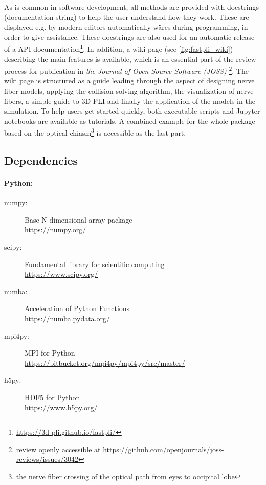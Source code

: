 % 
As is common in software development, all methods are provided with docstrings (documentation string) to help the user understand how they work.
These are displayed e.g. by modern editors automatically wäres during programming, in order to give assistance.
These docstrings are also used for an automatic release of a \ac{API} documentation\footnote{\url{https://3d-pli.github.io/fastpli/}}.
In addition, a wiki page (see \cref{fig:fastpli_wiki}) describing the main features is available, which is an essential part of the review process for publication in \textit{the Journal of Open Source Software (JOSS)} \cite{Matuschke2021} \footnote{review openly accessible at \url{https://github.com/openjournals/joss-reviews/issues/3042}}.
The wiki page is structured as a guide leading through the aspect of designing nerve fiber models, applying the collision solving algorithm, the visualization of nerve fibers, a simple guide to \ac{3D-PLI} and finally the application of the models in the simulation.
To help users get started quickly, both executable \python{} scripts and Jupyter notebooks are available as tutorials.
A combined example for the whole package based on the optical chiasm\footnote{the nerve fiber crossing of the optical path from eyes to occipital lobe} is accessible as the last part.
% 
% 
% 
\subsection{Dependencies}
% 
\paragraph{Python:}
\begin{description}
\item[numpy:] Base N-dimensional array package \cite{2019arXiv190710121V}\\
\url{https://numpy.org/}
\item[scipy:] Fundamental library for scientific computing \cite{2019arXiv190710121V}\\
\url{https://www.scipy.org/} 
\item[numba:] Acceleration of Python Functions \cite{Lam2015}\\
\url{https://numba.pydata.org/}
\item[mpi4py:] MPI for Python \cite{Dalcn2005, Dalcn2008, Dalcin2011}\\
\url{https://bitbucket.org/mpi4py/mpi4py/src/master/}
\item[h5py:] HDF5 for Python \cite{collette_python_hdf5_2014, hdf5}\\
\url{https://www.h5py.org/}
\end{description}
% 
